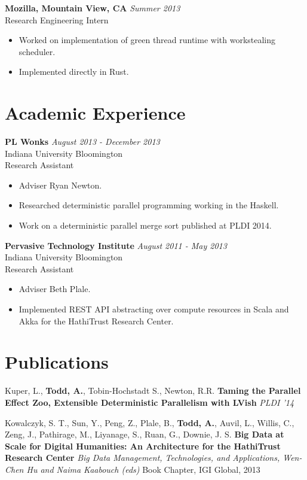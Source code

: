 \documentclass[margin]{res}
\begin{document}
\begin{resume}
 {\bf Mozilla, Mountain View, CA} \hfill \textit{Summer 2013} \\
 Research Engineering Intern
 \begin{itemize} \itemsep -2pt  %
 \item Worked on implementation of green thread runtime with workstealing scheduler.
 \item Implemented directly in Rust.  
 \end{itemize}
  
\section{Academic Experience}

 {\bf PL Wonks} \hfill \textit{August 2013 - December 2013} \\
 Indiana University Bloomington \\
 Research Assistant
 \begin{itemize} \itemsep -2pt  %
 \item Adviser Ryan Newton.
 \item Researched deterministic parallel programming working in the Haskell.
 \item Work on a deterministic parallel merge sort published at PLDI 2014.
 \end{itemize}


 {\bf Pervasive Technology Institute} \hfill \textit{August 2011 - May 2013} \\
 Indiana University Bloomington \\
 Research Assistant
 \begin{itemize} \itemsep -2pt  %
 \item Adviser Beth Plale.
 \item Implemented REST API abstracting over compute resources in Scala and Akka for the HathiTrust Research Center.
 \end{itemize}
 
\section{Publications}

Kuper, L., {\bf Todd, A.}, Tobin-Hochstadt S., Newton, R.R. {\bf Taming the Parallel Effect Zoo, Extensible Deterministic Parallelism with LVish} \textit{PLDI '14} 

Kowalczyk, S. T., Sun, Y., Peng, Z., Plale, B., {\bf Todd, A.}, Auvil, L., Willis, C., Zeng, J., Pathirage, M., Liyanage, S., Ruan, G., Downie, J. S. {\bf Big Data at Scale for Digital Humanities: An Architecture for the HathiTrust Research Center} \textit{Big Data Management, Technologies, and Applications, Wen-Chen Hu and Naima Kaabouch (eds)} Book Chapter, IGI Global, 2013


\end{resume}
\end{document}
